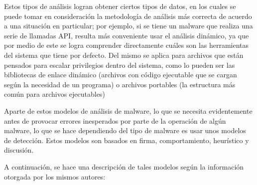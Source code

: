 Estos tipos de análisis logran obtener ciertos tipos de datos, en los cuales se
puede tomar en consideración la metodología de análisis más correcta de acuerdo
a una situación en particular; por ejemplo, si se tiene un malware que realiza
una serie de llamadas API, resulta más conveniente usar el análisis dinámico,
ya que por medio de este se logra comprender directamente cuáles son las
herramientas del sistema que tiene por defecto. Del mismo se aplica para
archivos que están pensados para escalar privilegios dentro del sistema, como lo
pueden ser las bibliotecas de enlace dinámico (archivos con código ejecutable
que se cargan según la necesidad de un programa) o archivos portables (la
estructura más común para archivos ejecutables)
\parencite{Aboaoja2022}

Aparte de estos modelos de análisis de malware, lo que se necesita evidentemente
antes de provocar errores inesperados por parte de la operación de algún
malware, lo que se hace dependiendo del tipo de malware es usar unos modelos de
detección. Estos modelos son basados en firma, comportamiento, heurístico y
discusión. \parencite{Aboaoja2022}

A continuación, se hace una descripción de tales modelos según la información
otorgada por los mismos autores:

